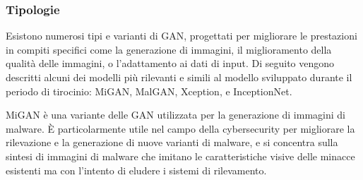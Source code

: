 \subsubsection{Tipologie}
Esistono numerosi tipi e varianti di GAN, progettati per migliorare le prestazioni in compiti specifici come la generazione di immagini, il miglioramento della qualità delle immagini, o l'adattamento ai dati di input. Di seguito vengono descritti alcuni dei modelli più rilevanti e simili al modello sviluppato durante il periodo di tirocinio: MiGAN, MalGAN, Xception, e InceptionNet.

MiGAN è una variante delle GAN utilizzata per la generazione di immagini di malware. È particolarmente utile nel campo della cybersecurity per migliorare la rilevazione e la generazione di nuove varianti di malware, e si concentra sulla sintesi di immagini di malware che imitano le caratteristiche visive delle minacce esistenti ma con l'intento di eludere i sistemi di rilevamento.

